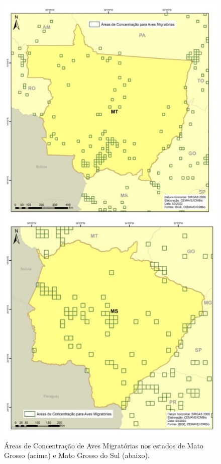 \documentclass[
  oneside]{scrbook}
\begin{document}
\begin{figure}[H]

{\centering \includegraphics[width=0.7\linewidth]{imagens/cap07/Fig_22_MT_MS} 

}

\caption{Áreas de Concentração de Aves Migratórias nos estados de Mato Grosso (acima) e Mato Grosso do Sul (abaixo).}\label{fig:42}
\end{figure}
\end{document}
